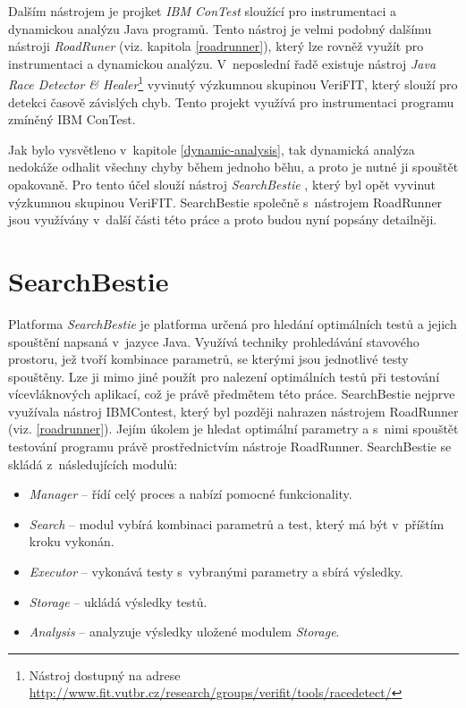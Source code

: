 Dalším nástrojem je projket \textit{IBM ConTest} \cite{cite:IBM} sloužící pro instrumentaci a dynamickou analýzu Java programů. Tento nástroj je velmi podobný dalšímu nástroji \textit{RoadRuner} \cite{cite:rr} (viz. kapitola \ref{roadrunner}), který lze rovněž využít pro instrumentaci a dynamickou analýzu. V~neposlední řadě existuje nástroj \textit{Java Race Detector \& Healer}\footnote{Nástroj dostupný na adrese \url{http://www.fit.vutbr.cz/research/groups/verifit/tools/racedetect/}} vyvinutý výzkumnou skupinou VeriFIT, který slouží pro detekci časově závislých chyb. Tento projekt využívá pro instrumentaci programu zmíněný IBM ConTest.

Jak bylo vysvětleno v~kapitole \ref{dynamic-analysis}, tak dynamická analýza nedokáže odhalit všechny chyby během jednoho běhu, a proto je nutné ji spouštět opakovaně. Pro tento účel slouží nástroj \textit{SearchBestie} \cite{cite:sb}, který byl opět vyvinut výzkumnou skupinou VeriFIT. SearchBestie společně s~nástrojem RoadRunner jsou využívány v~další části této práce a proto budou nyní popsány detailněji.

\section{SearchBestie}\label{searchbestie}
Platforma \textit{SearchBestie} \cite{cite:sb} je platforma určená pro hledání optimálních testů a jejich spouštění napsaná v~jazyce Java. Využívá techniky prohledávání stavového prostoru, jež tvoří kombinace parametrů, se kterými jsou jednotlivé testy spouštěny. Lze ji mimo jiné použít pro nalezení optimálních testů při testování vícevláknových aplikací, což je právě předmětem této práce. SearchBestie nejprve využívala nástroj IBMContest, který byl později nahrazen nástrojem RoadRunner (viz. \ref{roadrunner}). Jejím úkolem je hledat optimální parametry a s~nimi spouštět testování programu právě prostřednictvím nástroje RoadRunner. SearchBestie se skládá z~následujících modulů: %

\begin{itemize}
\item \textit{Manager} -- řídí celý proces a nabízí pomocné funkcionality.
\item \textit{Search} -- modul vybírá kombinaci parametrů a test, který má být v~příštím kroku vykonán.
\item \textit{Executor} -- vykonává testy s~vybranými parametry a sbírá výsledky.
\item \textit{Storage} -- ukládá výsledky testů.
\item \textit{Analysis} -- analyzuje výsledky uložené modulem \textit{Storage}.
\end{itemize}

